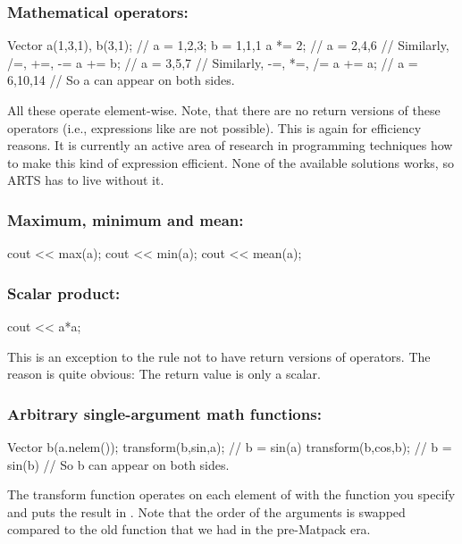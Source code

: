 \subsubsection{Mathematical operators:}
\begin{code}
Vector a(1,3,1), b(3,1); // a = 1,2,3; b = 1,1,1
a *= 2;                  // a = 2,4,6
                         // Similarly, /=, +=, -=
a += b;                  // a = 3,5,7
                         // Similarly, -=, *=, /=
a += a;                  // a = 6,10,14
                         // So a can appear on both sides.
\end{code}

All these operate element-wise.  Note, that there are no return
versions of these operators (i.e., expressions like  are
not possible). This is again for efficiency reasons. It is currently
an active area of research in programming techniques how to make this
kind of expression efficient. None of the available solutions works,
so ARTS has to live without it.

\subsubsection{Maximum, minimum and mean:}
\begin{code}
cout << max(a);
cout << min(a);
cout << mean(a);
\end{code}

\subsubsection{Scalar product:}
\begin{code}
cout << a*a;
\end{code}

This is an exception to the rule not to have return versions of
operators. The reason is quite obvious: The return value is only a
scalar. 

\subsubsection{Arbitrary single-argument math functions:}
\begin{code}
Vector b(a.nelem());
transform(b,sin,a);  // b = sin(a)
transform(b,cos,b);  // b = sin(b)
                     // So b can appear on both sides.
\end{code}

The transform function operates on each element of  with the
function you specify and puts the result in . Note that the
order of the arguments is swapped compared to the old function
 that we had in the pre-Matpack era.


